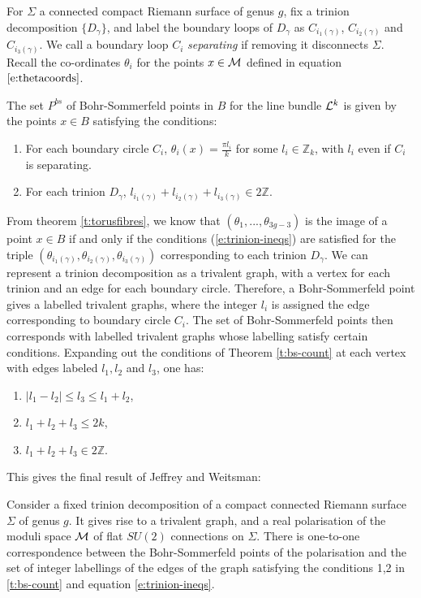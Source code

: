 	For $\Sigma$ a connected compact Riemann surface of genus $g$, fix a trinion decomposition $\{D_\gamma\}$, and label the boundary loops of $D_\gamma$ as $C_{i_1(\gamma)}$, $C_{i_2(\gamma)}$ and $C_{i_3(\gamma)}$. We call a boundary loop $C_i$ \emph{separating} if removing it disconnects $\Sigma$. Recall the co-ordinates $\theta_i$ for the points $x\in \mathcal{M}$ defined in equation $\ref{e:thetacoords}$. 
	\begin{theorem}
		\label{t:bs-count}
		The set $P^{bs}$ of Bohr-Sommerfeld points in $B$ for the line bundle $\mathcal{L}^k$ is given by the points $x\in B$ satisfying the conditions:
		\begin{enumerate}
			\item For each boundary circle $C_i$, $\theta_i(x) = \frac{\pi l_i}{k}$ for some $l_i \in \mathbb{Z}_k$, with $l_i$ even if $C_i$ is separating.
			\item For each trinion $D_\gamma$, $l_{i_1(\gamma)} + l_{i_2(\gamma)} + l_{i_3(\gamma)} \in 2\mathbb{Z}$.
		\end{enumerate}
	\end{theorem}
	From theorem \ref{t:torusfibres}, we know that $(\theta_1,...,\theta_{3g-3})$ is the image of a point $x\in B$ if and only if the conditions (\ref{e:trinion-ineqs}) are satisfied for the triple $(\theta_{i_1(\gamma)}, \theta_{i_2(\gamma)}, \theta_{i_3(\gamma)})$ corresponding to each trinion $D_\gamma$. We can represent a trinion decomposition as a trivalent graph, with a vertex for each trinion and an edge for each boundary circle. Therefore, a Bohr-Sommerfeld point gives a labelled trivalent graphs, where the integer $l_i$ is assigned the edge corresponding to boundary circle $C_i$. The set of Bohr-Sommerfeld points then corresponds with labelled trivalent graphs whose labelling satisfy certain conditions. Expanding out the conditions of Theorem \ref{t:bs-count} at each vertex with edges labeled $l_1,l_2$ and $l_3$, one has:
	\begin{enumerate}
		\item $|l_1-l_2| \leq l_3 \leq l_1+l_2$,
		\item $l_1+l_2+l_3 \leq 2k$,
		\item $l_1+l_2+l_3 \in 2\mathbb{Z}$.
	\end{enumerate}
	This gives the final result of Jeffrey and Weitsman:
	\begin{theorem}
		Consider a fixed trinion decomposition of a compact connected Riemann surface $\Sigma$ of genus $g$. It gives rise to a trivalent graph, and a real polarisation of the moduli space $\mathcal{M}$ of flat $SU(2)$ connections on $\Sigma$. There is one-to-one correspondence between the Bohr-Sommerfeld points of the polarisation and the set of integer labellings of the edges of the graph satisfying the conditions 1,2 in \ref{t:bs-count} and equation \ref{e:trinion-ineqs}.
	\end{theorem}


